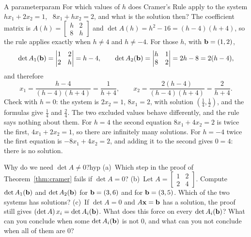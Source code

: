 \documentclass[11pt]{article}
\begin{document}
\begin{exmp}{A parameter}{param}
For which values of $h$ does Cramer's Rule apply to the system $hx_1+2x_2=1$, \ $8x_1+hx_2=2$, and what is the solution then? The coefficient matrix is $A(h)=\begin{bmatrix}h&2\\8&h\end{bmatrix}$ and $\det A(h)=h^2-16=(h-4)(h+4)$, so the rule applies exactly when $h\neq4$ and $h\neq-4$. For those $h$, with $\mathbf{b}=(1,2)$,
\[
\det A_1(\mathbf{b})=\begin{vmatrix}1&2\\2&h\end{vmatrix}=h-4,\qquad\det A_2(\mathbf{b})=\begin{vmatrix}h&1\\8&2\end{vmatrix}=2h-8=2(h-4),
\]
and therefore
\[
x_1=\frac{h-4}{(h-4)(h+4)}=\frac1{h+4},\qquad x_2=\frac{2(h-4)}{(h-4)(h+4)}=\frac2{h+4}.
\]
Check with $h=0$: the system is $2x_2=1$, $8x_1=2$, with solution $(\tfrac14,\tfrac12)$, and the formulas give $\tfrac14$ and $\tfrac24$. The two excluded values behave differently, and the rule says nothing about them. For $h=4$ the second equation $8x_1+4x_2=2$ is twice the first, $4x_1+2x_2=1$, so there are infinitely many solutions. For $h=-4$ twice the first equation is $-8x_1+4x_2=2$, and adding it to the second gives $0=4$: there is no solution.
\end{exmp}

\begin{think}{Why do we need $\det A\neq0$?}{hyp}
(a)~Which step in the proof of Theorem~\ref{thm:cramer} fails if $\det A=0$? (b)~Let $A=\begin{bmatrix}1&2\\2&4\end{bmatrix}$. Compute $\det A_1(\mathbf{b})$ and $\det A_2(\mathbf{b})$ for $\mathbf{b}=(3,6)$ and for $\mathbf{b}=(3,5)$. Which of the two systems has solutions? (c)~If $\det A=0$ and $A\mathbf{x}=\mathbf{b}$ has a solution, the proof still gives $(\det A)\,x_i=\det A_i(\mathbf{b})$. What does this force on every $\det A_i(\mathbf{b})$? What can you conclude when some $\det A_i(\mathbf{b})$ is not $0$, and what can you not conclude when all of them are $0$?
\end{think}
\end{document}
